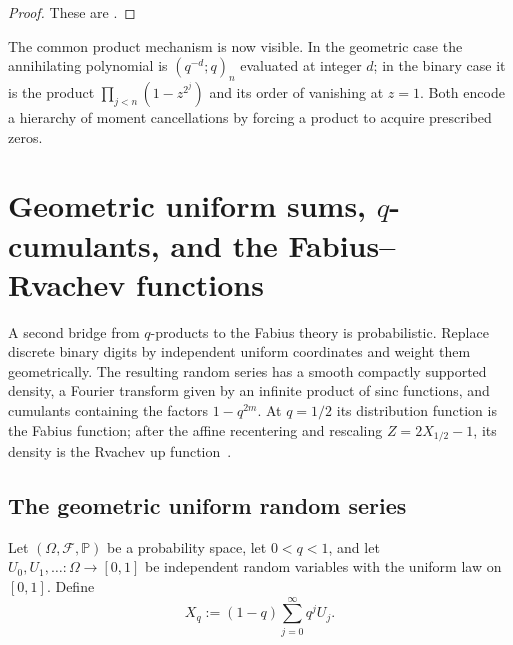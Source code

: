\documentclass[11pt,a4paper,oneside,openany]{book}
\theoremstyle{definition}
\theoremstyle{remark}
\begin{document}
\begin{proof}
These are .
\end{proof}

The common product mechanism is now visible.  In the geometric case the annihilating polynomial is $(q^{-d};q)_n$ evaluated at integer $d$; in the binary case it is the product $\prod_{j<n}(1-z^{2^j})$ and its order of vanishing at $z=1$.  Both encode a hierarchy of moment cancellations by forcing a product to acquire prescribed zeros.

\chapter{Geometric uniform sums, \texorpdfstring{$q$}{q}-cumulants, and the Fabius--Rvachev functions}\label{chap:geometric-uniform-fabius}

A second bridge from $q$-products to the Fabius theory is probabilistic.  Replace discrete binary digits by independent uniform coordinates and weight them geometrically.  The resulting random series has a smooth compactly supported density, a Fourier transform given by an infinite product of sinc functions, and cumulants containing the factors $1-q^{2m}$.  At $q=1/2$ its distribution function is the Fabius function; after the affine recentering and rescaling $Z=2X_{1/2}-1$, its density is the Rvachev up function~\cite{Fabius1966,Rvachev1990,AriasDeReyna1982,ReshetnikovProveIt2026}.

\section{The geometric uniform random series}

Let $(\Omega,\mathcal F,\mathbb P)$ be a probability space, let $0<q<1$,
and let $U_0,U_1,\ldots:\Omega\to[0,1]$ be independent random variables with
the uniform law on $[0,1]$.  Define
\begin{equation}\label{eq:geometric-uniform-series}
 X_q:=(1-q)\sum_{j=0}^{\infty}q^jU_j.
\end{equation}
\end{document}

